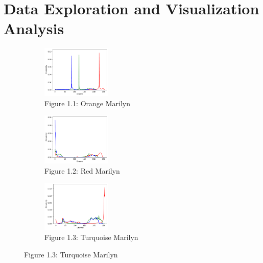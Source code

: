 \documentclass{article}
\begin{document}
\hypertarget{data-exploration-and-visualization-analysis}{%
\section{Data Exploration and Visualization
Analysis}\label{data-exploration-and-visualization-analysis}}

\begin{figure}[ht]
  \centering
  \begin{subfigure}{0.3\textwidth}
    \centering
    \includegraphics[width=125px]{main_files/figure-latex/2_1_orange_marilyn_dist.pdf}
    \caption{Figure 1.1: Orange Marilyn}
    \label{fig:1_1_orange_marilyn}
  \end{subfigure}
  \hfill
  \begin{subfigure}{0.3\textwidth}
    \centering
    \includegraphics[width=125px]{main_files/figure-latex/2_2_red_marilyn_dist.pdf}
    \caption{Figure 1.2: Red Marilyn}
    \label{fig:1_2_red_marilyn}
  \end{subfigure}
  \hfill
  \begin{subfigure}{0.3\textwidth}
    \centering
    \includegraphics[width=125px]{main_files/figure-latex/2_3_turq_marilyn_dist.pdf}
    \caption{Figure 1.3: Turquoise Marilyn}
    \label{fig:1_3_turq_marilyn}
  \end{subfigure}

  \vspace{1em} %


\end{figure}
\end{document}
